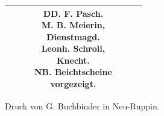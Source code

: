 \begin{sideways}
\begin{minipage}{0.92\textheight}
\begin{center}
\begin{tabular}{|r|c|c|c|c|c|c|}
 & & & \zl{DD. F. Pasch.\\ M. B. Meierin,\\ Dienstmagd.\\ Leonh. Schroll,\\ Knecht.\\ NB. Beichtscheine\\ vorgezeigt.} & & & \\ \hline
\end{tabular}
\end{center}
\end{minipage}
\end{sideways}

\clearpage
{}
\begin{unterschrift}
Druck von G. Buchbinder in Neu-Ruppin.
\end{unterschrift}




